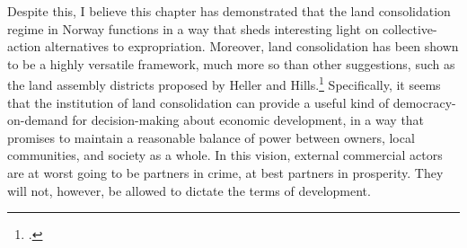 Despite this, I believe this chapter has demonstrated that the land consolidation regime in Norway functions in a way that sheds interesting light on collective-action alternatives to expropriation. Moreover, land consolidation has been shown to be a highly versatile framework, much more so than other suggestions, such as the land assembly districts proposed by Heller and Hills.\footcite{heller08} Specifically, it seems that the institution of land consolidation can provide a useful kind of democracy-on-demand for decision-making about economic development, in a way that promises to maintain a reasonable balance of power between owners, local communities, and society as a whole. In this vision, external commercial actors are at worst going to be partners in crime, at best partners in prosperity. They will not, however, be allowed to dictate the terms of development.